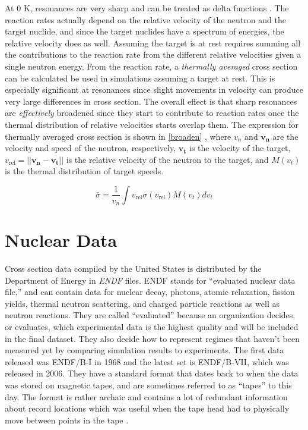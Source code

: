 At 0 K, resonances are very sharp and can be treated as delta functions \cite{duderstadt}.  The reaction rates actually depend on the relative velocity of the neutron and the target nuclide, and since the target nuclides have a spectrum of energies, the relative velocity does as well.  Assuming the target is at rest requires summing all the contributions to the reaction rate from the different relative velocities given a single neutron energy.  From the reaction rate, a \emph{thermally averaged} cross section can be calculated be used in simulations assuming a target at rest.  This is especially significant at resonances since slight movements in velocity can produce very large differences in cross section.  The overall effect is that sharp resonances are \emph{effectively} broadened since they start to contribute to reaction rates once the thermal distribution of relative velocities starts overlap them.   The expression for thermally averaged cross section is shown in \eqref{broaden} \cite{openmc}, where $v_n$ and $\boldsymbol{v_n}$ are the velocity and speed of the neutron, respectively, $\boldsymbol{v_t}$ is the velocity of the target, $v_\mathrm{rel} = || \boldsymbol{v_n} -\boldsymbol{v_t}||$ is the relative velocity of the neutron to the target, and $M(v_t)$ is the thermal distribution of target speeds.

\begin{equation}
\bar{\sigma} = \frac{1}{v_n} \int v_\mathrm{rel} \sigma(v_\mathrm{rel}) M(v_t) dv_t
\label{broaden}
\end{equation}

\section{Nuclear Data}

Cross section data compiled by the United States is distributed by the Department of Energy in \emph{ENDF} files.  ENDF stands for ``evaluated nuclear data file,'' and can contain data for nuclear decay, photons, atomic relaxation, fission yields, thermal neutron scattering, and charged particle reactions as well as neutron reactions.  They are called ``evaluated'' because an organization decides, or evaluates, which experimental data is the highest quality and will be included in the final dataset.  They also decide how to represent regimes that haven't been measured yet by comparing simulation results to experiments.   The first data released was ENDF/B-I in 1968 and the latest set is ENDF/B-VII, which was released in 2006.  They have a standard format that dates back to when the data was stored on magnetic tapes, and are sometimes referred to as ``tapes'' to this day.  The format is rather archaic and contains a lot of redundant information about record locations which was useful when the tape head had to physically move between points in the tape \cite{MT_numbers}.  

